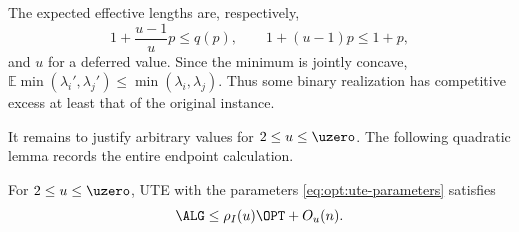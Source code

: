The expected effective lengths are,
respectively,
\begin{equation}
 1+\frac{u-1}{u}p\le q(p),
 \qquad
 1+(u-1)p\le1+p,
\end{equation}
and $u$ for a deferred value.  Since the minimum is jointly concave,
$\mathbb E\min(\lambda_i',\lambda_j')\le\min(\lambda_i,\lambda_j)$.  Thus some binary realization
has competitive excess at least that of the original instance.

It remains to justify arbitrary values for $2\le u\le \uzero$.  The following
quadratic lemma records the entire endpoint calculation.

\begin{lemma}
\label{lem:opt:ute-endpoint-game}
For $2\le u\le \uzero$, UTE with the parameters
\cref{eq:opt:ute-parameters} satisfies
\begin{equation}
 \ALG\le\rho_I(u)\OPT+O_u(n).
\end{equation}
\end{lemma}

